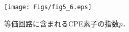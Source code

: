 \begin{figure}[h]
	\begin{center}
	\texttt{[image: Figs/fig5\_6.eps]} 
	\end{center}
	\caption{
		等価回路に含まれるCPE素子の指数$p$．
	} 
	\label{fig:fig5_6}
\end{figure}

